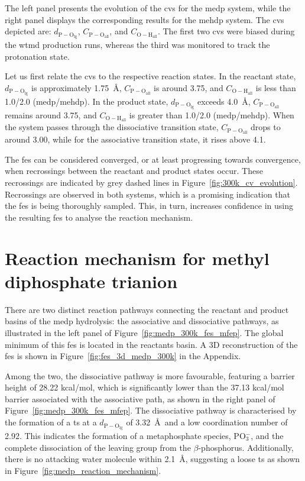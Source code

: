 The left panel presents the evolution of the \acp{cv} for the \ac{medp} system, while the right panel displays the corresponding results for the \ac{mehdp} system. The \acp{cv} depicted are: $d_\mathrm{P-O_{\mathrm{lg}}}$, $C_\mathrm{P-O_{\mathrm{all}}}$, and $C_\mathrm{O-H_{\mathrm{all}}}$. The first two \acp{cv} were biased during the \ac{wtmd} production runs, whereas the third was monitored to track the protonation state.

Let us first relate the \acp{cv} to the respective reaction states. In the reactant state, $d_\mathrm{P-O_{\mathrm{lg}}}$ is approximately 1.75~\AA, $C_\mathrm{P-O_{\mathrm{all}}}$ is around 3.75, and $C_\mathrm{O-H_{\mathrm{all}}}$ is less than 1.0/2.0 (\ac{medp}/\ac{mehdp}). In the product state, $d_\mathrm{P-O_{\mathrm{lg}}}$ exceeds 4.0~\AA, $C_\mathrm{P-O_{\mathrm{all}}}$ remains around 3.75, and $C_\mathrm{O-H_{\mathrm{all}}}$ is greater than 1.0/2.0 (\ac{medp}/\ac{mehdp}). When the system passes through the dissociative transition state, $C_\mathrm{P-O_{\mathrm{all}}}$ drops to around 3.00, while for the associative transition state, it rises above 4.1.

The \ac{fes} can be considered converged, or at least progressing towards convergence, when recrossings between the reactant and product states occur. These recrossings are indicated by grey dashed lines in Figure~\ref{fig:300k_cv_evolution}. Recrossings are observed in both systems, which is a promising indication that the \ac{fes} is being thoroughly sampled. This, in turn, increases confidence in using the resulting \ac{fes} to analyse the reaction mechanism.


\section{Reaction mechanism for methyl diphosphate trianion}

There are two distinct reaction pathways connecting the reactant and product basins of the \ac{medp} hydrolysis: the associative and dissociative pathways, as illustrated in the left panel of Figure~\ref{fig:medp_300k_fes_mfep}. The global minimum of this \ac{fes} is located in the reactants basin. A 3D reconstruction of the \ac{fes} is shown in Figure~\ref{fig:fes_3d_medp_300k} in the Appendix.

Among the two, the dissociative pathway is more favourable, featuring a barrier height of 28.22 kcal/mol, which is significantly lower than the 37.13 kcal/mol barrier associated with the associative path, as shown in the right panel of Figure~\ref{fig:medp_300k_fes_mfep}. The dissociative pathway is characterised by the formation of a \ac{ts} at a $d_\mathrm{P-O_{\mathrm{lg}}}$ of 3.32~\AA\ and a low coordination number of 2.92. This indicates the formation of a metaphosphate species, PO$_3^-$, and the complete dissociation of the leaving group from the $\beta$-phosphorus. Additionally, there is no attacking water molecule within 2.1~\AA, suggesting a loose \ac{ts} as shown in Figure~\ref{fig:medp_reaction_mechanism}.

